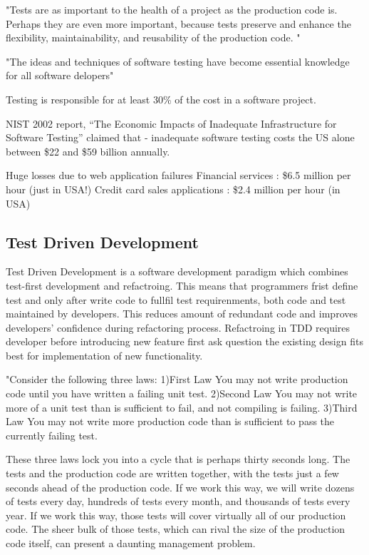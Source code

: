 \documentclass{llncs}
\begin{document}
"Tests are as important to the health of a project as the production code is. 
Perhaps they are even more important, because tests preserve and enhance the ﬂexibility, maintainability, and reusability of the production code. "\cite{MartinClean}

"The ideas and techniques of software testing have become essential knowledge for all software delopers"\cite{IntroductionST}

Testing is responsible for at least 30\% of the cost in a software project.\cite{Lecture2}

NIST 2002 report, “The Economic Impacts of Inadequate Infrastructure for Software Testing” claimed that - inadequate software testing costs the US alone between \$22 and \$59 billion annually. \cite{Lecture1}

Huge losses due to web application failures
Financial services : \$6.5 million per hour (just in USA!)
Credit card sales applications : \$2.4 million per hour (in USA)
\cite{Lecture1}

\subsection{Test Driven Development}

Test Driven Development is a software development paradigm which combines test-first development and refactroing. This means that programmers frist define test and only after write code to fullfil test requirenments, both code and test maintained by developers. This reduces amount of redundant code and improves developers' confidence during refactoring process.
Refactroing in TDD requires developer before introducing new feature first ask question the existing design fits best for implementation of new functionality.\cite{tdd} \cite{TDDPractical}

"Consider the following three laws:
1)First Law You may not write production code until you have written a failing unit test.
2)Second Law You may not write more of a unit test than is sufficient to fail, and not compiling is failing.
3)Third Law You may not write more production code than is sufficient to pass the currently failing test.

These three laws lock you into a cycle that is perhaps thirty seconds long.
The tests and the production code are written together, with the tests just a few seconds ahead of the production code. 
If we work this way, we will write dozens of tests every day, hundreds of tests every month, and thousands of tests every year. 
If we work this way, those tests will cover virtually all of our production code. 
The sheer bulk of those tests, which can rival the size of the production code itself, can present a daunting management problem.\cite{MartinClean}
\end{document}

